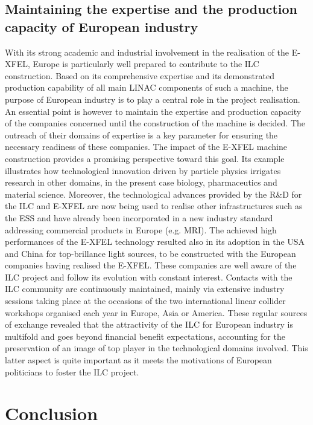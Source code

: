 \documentclass[%
 reprint,
 amsmath,amssymb,
 aps,
]{revtex4-1}
\begin{document}
\subsection{\label{sec:discussionInd}Maintaining the expertise and the production capacity of European industry}

With its strong academic and industrial involvement in the realisation of the E-XFEL, Europe is
particularly well prepared to contribute to the ILC construction. Based on its comprehensive expertise
and its demonstrated production capability of all main LINAC components of such a machine, the
purpose of European industry is to play a central role in the project realisation. An essential point
is however to maintain the expertise and production capacity of the companies concerned until the
construction of the machine is decided.
The outreach of their domains of expertise is a key parameter for ensuring the necessary readiness
of these companies. The impact of the E-XFEL machine construction provides a promising perspective
toward this goal. Its example illustrates how technological innovation driven by particle physics irrigates
research in other domains, in the present case biology, pharmaceutics and material science. Moreover,
the technological advances provided by the R\&D for the ILC and E-XFEL are now being used to realise
other infrastructures such as the ESS and have already been incorporated in a new industry standard
addressing commercial products in Europe (e.g. MRI). The achieved high performances of the E-XFEL
technology resulted also in its adoption in the USA and China for top-brillance light sources, to be
constructed with the European companies having realised the E-XFEL.
These companies are well aware of the ILC project and follow its evolution with constant interest.
Contacts with the ILC community are continuously maintained, mainly via extensive industry sessions
taking place at the occasions of the two international linear collider workshops organised each year in
Europe, Asia or America. These regular sources of exchange revealed that the attractivity of the ILC
for European industry is multifold and goes beyond financial benefit expectations, accounting for the
preservation of an image of top player in the technological domains involved. This latter aspect is quite
important as it meets the motivations of European politicians to foster the ILC project.

\section{Conclusion}



\end{document}
